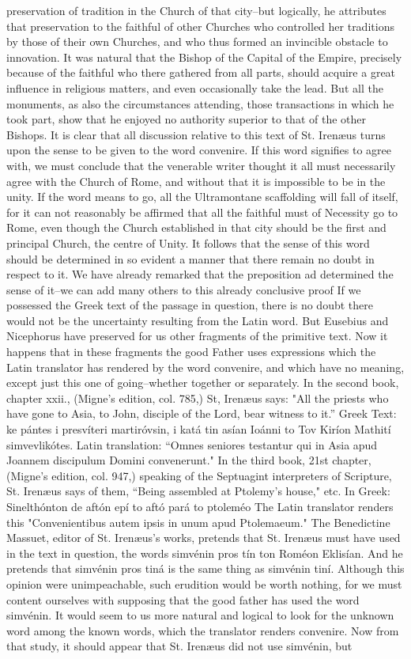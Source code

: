 preservation of tradition in the Church of that city--but logically, he attributes that preservation to the faithful of other Churches who controlled her traditions by those of their own Churches, and who thus formed an invincible obstacle to innovation. It was natural that the Bishop of the Capital of the Empire, precisely because of the faithful who there gathered from all parts, should acquire a great influence in religious matters, and even occasionally take the lead. But all the monuments, as also the circumstances attending, those transactions in which he took part, show that he enjoyed no authority superior to that of the other Bishops. It is clear that all discussion relative to this text of St. Irenæus turns upon the sense to be given to the word convenire. If this word signifies to agree with, we must conclude that the venerable writer thought it all must necessarily agree with the Church of Rome, and without that it is impossible to be in the unity. If the word means to go, all the Ultramontane scaffolding will fall of itself, for it can not reasonably be affirmed that all the faithful must of Necessity go to Rome, even though the Church established in that city should be the first and principal Church, the centre of Unity. It follows that the sense of this word should be determined in so evident a manner that there remain no doubt in respect to it. We have already remarked that the preposition ad determined the sense of it--we can add many others to this already conclusive proof If we possessed the Greek text of the passage in question, there is no doubt there would not be the uncertainty resulting from the Latin word. But Eusebius and Nicephorus have preserved for us other fragments of the primitive text. Now it happens that in these fragments the good Father uses expressions which the Latin translator has rendered by the word convenire, and which have no meaning, except just this one of going--whether together or separately. In the second book, chapter xxii., (Migne's edition, col. 785,) St, Irenæus says: "All the priests who have gone to Asia, to John, disciple of the Lord, bear witness to it.” Greek Text: ke pántes i presvíteri martiróvsin, i katá tin asían Ioánni to Tov Kiríon Mathití simvevlikótes. Latin translation: “Omnes seniores testantur qui in Asia apud Joannem discipulum Domini convenerunt." In the third book, 21st chapter, (Migne's edition, col. 947,) speaking of the Septuagint interpreters of Scripture, St. Irenæus says of them, “Being assembled at Ptolemy's house," etc. In Greek: Sinelthónton de aftón epí to aftó pará to ptoleméo The Latin translator renders this "Convenientibus autem ipsis in unum apud Ptolemaeum." The Benedictine Massuet, editor of St. Irenæus's works, pretends that St. Irenæus must have used in the text in question, the words simvénin pros tín ton Roméon Eklisían. And he pretends that simvénin pros tiná is the same thing as simvénin tiní. Although this opinion were unimpeachable, such erudition would be worth nothing, for we must content ourselves with supposing that the good father has used the word simvénin. It would seem to us more natural and logical to look for the unknown word among the known words, which the translator renders convenire. Now from that study, it should appear that St. Irenæus did not use simvénin, but 